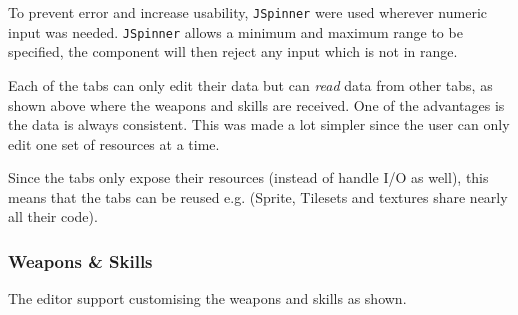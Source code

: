 To prevent error and increase usability,  \texttt{JSpinner} were used wherever numeric input was needed. \texttt{JSpinner} allows a minimum and maximum range to be specified,  the component will then reject any input which is not in range.

Each of the tabs can only edit their data but can \emph{read} data from other tabs, as shown above where the weapons and skills are received. One of the advantages is the data is always consistent. This was made a lot simpler since the user can only edit one set of resources at a time.

Since the tabs only expose their resources (instead of handle I/O as well),  this means that the tabs can be reused e.g. (Sprite, Tilesets and textures share nearly all their code).

\clearpage
\subsubsection{Weapons \& Skills}

The editor support customising the weapons and skills as shown. 

